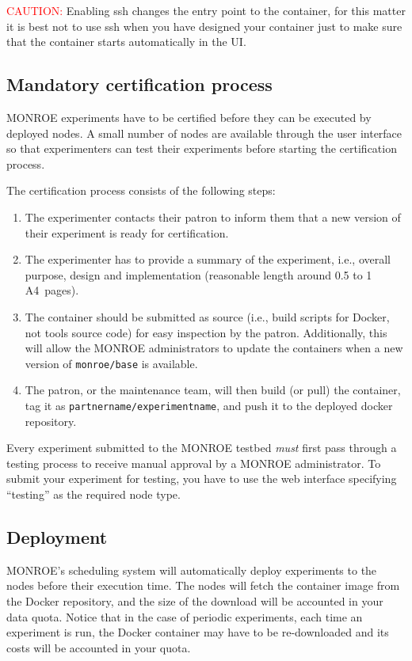 \documentclass[a4paper,10pt]{article}
\newcommand{\monroe}{MONROE}
\newcommand{\identifier}[1]{{\texttt{\small{#1}}}}
\begin{document}
\textcolor{red}{CAUTION:} Enabling ssh changes the entry point to the container, for this matter it is best not to use ssh when you have designed your container just to make sure that the container starts automatically in the UI.


\subsection{Mandatory certification process}
\label{subsec:testingProcess}
\monroe{} experiments have to be certified before they can be executed by deployed nodes.
A small number of nodes are available through the user interface so that experimenters can test their experiments before starting the certification process.

The certification process consists of the following steps:
\begin{enumerate}
	\item The experimenter contacts their patron to inform them that a new version of their experiment is ready for certification.
	
	\item The experimenter has to provide a summary of the experiment, i.e., overall purpose, design and implementation (reasonable length around \num{0.5} to \num{1} A4~pages).
	
	\item The container should be submitted as source (i.e., build scripts for Docker, not tools source code) for easy inspection by the patron.
	Additionally, this will allow the \monroe{} administrators to update the containers when a new version of \identifier{monroe/base} is available.
	
	\item The patron, or the maintenance team, will then build (or pull) the container, tag it as \identifier{partnername/\allowbreak experimentname}, and push it to the deployed docker repository.
\end{enumerate}

Every experiment submitted to the \monroe{} testbed \emph{must} first pass through a testing process to receive manual approval by a \monroe{} administrator.
To submit your experiment for testing, you have to use the web interface specifying ``testing'' as the required node type.

\subsection{Deployment}
\label{subsec:deployment}
\monroe{}'s scheduling system will automatically deploy experiments to the nodes before their execution time.
The nodes will fetch the container image from the Docker repository, and the size of the download will be accounted in your data quota.
Notice that in the case of periodic experiments, each time an experiment is run, the Docker container may have to be re-downloaded and its costs will be accounted in your quota.
\end{document}
